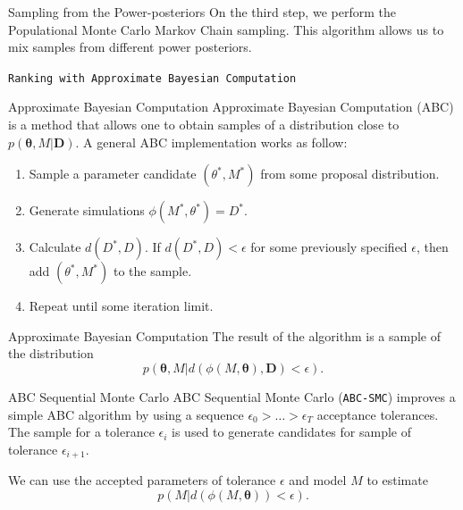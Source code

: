 \documentclass{beamer}
\begin{document}
\begin{frame}{Sampling from the Power-posteriors}
On the third step, we perform the \alert{Populational Monte Carlo Markov
Chain} sampling. This algorithm allows us to mix samples from different 
power posteriors.
\end{frame}


\begin{frame}{}
\begin{center}
    \texttt{Ranking with Approximate Bayesian Computation}
\end{center}
\end{frame}


\begin{frame}{Approximate Bayesian Computation}
Approximate Bayesian Computation (ABC) is a method that allows one to
obtain samples of a distribution close to $p ({\bm \theta}, M | {\bm
D})$. \pause
A general ABC implementation works as follow:

\begin{enumerate}
    \pause
    \item{Sample a parameter candidate $(\theta^*, M^*)$ from some 
        proposal distribution.}
    \pause
    \item{Generate simulations $\phi (M^*, \theta^*) = D^*$.}
    \pause
    \item{Calculate $d (D^*, D).$ If $d (D^*, D) < \epsilon$ for some 
        previously specified $\epsilon$, then add $(\theta^*, M^*)$ to 
        the sample.}
    \pause
    \item{Repeat until some iteration limit.}
\end{enumerate}
\end{frame}


\begin{frame}{Approximate Bayesian Computation}
The result of the algorithm is a sample of the distribution 
\begin{equation*}
p ({\bm \theta}, M| d (\phi (M, {\bm \theta}), {\bm D}) < \epsilon).
\end{equation*}

\end{frame}

\begin{frame}{ABC Sequential Monte Carlo}
\alert{ABC Sequential Monte Carlo (\texttt{ABC-SMC})} improves a simple
ABC algorithm by using a sequence $\epsilon_0 > \ldots > \epsilon_T$
    acceptance tolerances. 
\pause The sample for a tolerance $\epsilon_i$ is used to generate 
candidates for sample of tolerance $\epsilon_{i + 1}$.

\pause
We can use the accepted parameters of tolerance $\epsilon$ and model $M$
to estimate 
\begin{equation*}
    p (M | d (\phi (M, {\bm \theta})) < \epsilon).
\end{equation*}
\end{frame}
\end{document}
